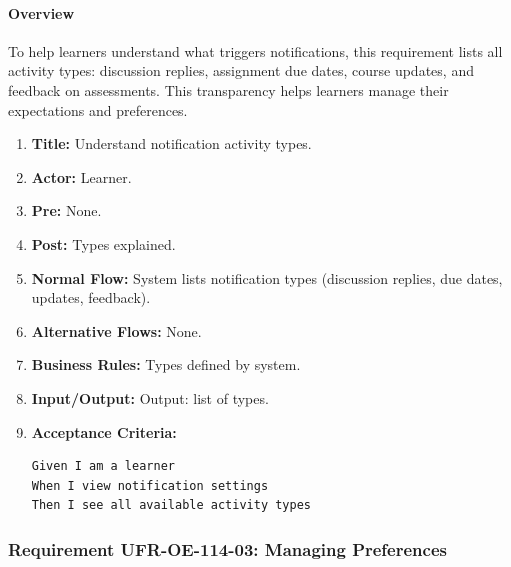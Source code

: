 \paragraph{Overview}
To help learners understand what triggers notifications, this requirement lists all activity types: discussion replies, assignment due dates, course updates, and feedback on assessments. This transparency helps learners manage their expectations and preferences.
\begin{enumerate}[label=\textbf{\arabic*.}]
\item \textbf{Title:} Understand notification activity types.
\item \textbf{Actor:} Learner.
\item \textbf{Pre:} None.
\item \textbf{Post:} Types explained.
\item \textbf{Normal Flow:} System lists notification types (discussion replies, due dates, updates, feedback).
\item \textbf{Alternative Flows:} None.
\item \textbf{Business Rules:} Types defined by system.
\item \textbf{Input/Output:} Output: list of types.
\item \textbf{Acceptance Criteria:}
    \begin{verbatim}
Given I am a learner
When I view notification settings
Then I see all available activity types
    \end{verbatim}
\end{enumerate}

\subsubsection{Requirement UFR-OE-114-03: Managing Preferences}
